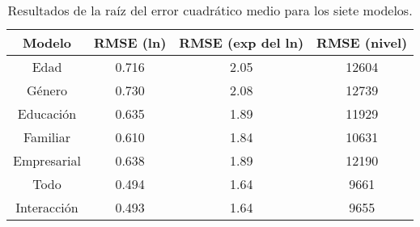 \begin{table}[H!]
\centering
\caption{Resultados de la raíz del error cuadrático medio para los siete modelos.} 
\label{Tab:RMSE}
\begin{tabular}{cccc}
  \hline
Modelo & RMSE (ln) & RMSE (exp del ln) & RMSE (nivel) \\ 
  \hline
Edad & 0.716 & 2.05 & 12604 \\ 
  Género & 0.730 & 2.08 & 12739 \\ 
  Educación & 0.635 & 1.89 & 11929 \\ 
  Familiar & 0.610 & 1.84 & 10631 \\ 
  Empresarial & 0.638 & 1.89 & 12190 \\ 
  Todo & 0.494 & 1.64 & 9661 \\ 
  Interacción & 0.493 & 1.64 & 9655 \\ 
   \hline
\end{tabular}
\end{table}
